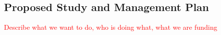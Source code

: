 \documentclass[12pt]{article}
\def\ebextw{EBEX2013}
\def\ebexsk{EBEX-IDS}
\newcommand{\comred}[1]{\textcolor{red}{#1}}
\begin{document}
\vspace{-0.22in}

\subsection{Proposed Study and Management Plan}
\label{sec:management}

\vspace{-0.05in}

\comred{Describe what we want to do, who is doing what, what we are funding}


\end{document}
